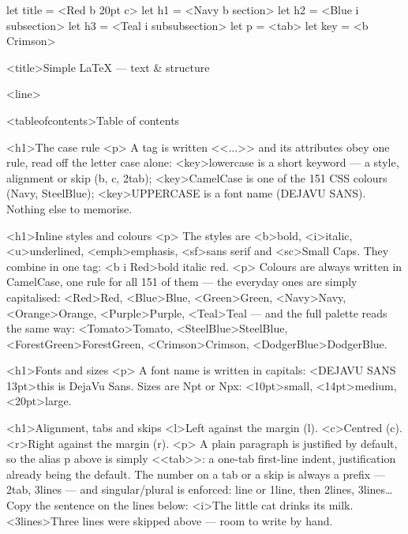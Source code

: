 \documentclass[
margins=20,
font=Latin Modern Roman,
size=12,
lang=en
]{scholatex}
\begin{document}
	
	let title = <Red b 20pt c>
	let h1    = <Navy b section>
	let h2    = <Blue i subsection>
	let h3    = <Teal i subsubsection>
	let p     = <tab>
	let key   = <b Crimson>
	
	<title>Simple LaTeX — text & structure
	
	<line>
	
	<tableofcontents>{Table of contents}
	
	<h1>The case rule
	<p>{
		A tag is written <<...>> and its attributes obey one rule, read off the
		letter case alone: <key>{lowercase} is a short keyword — a style,
		alignment or skip (b, c, 2tab); <key>{CamelCase} is one
		of the 151 CSS colours (Navy, SteelBlue);
		<key>{UPPERCASE} is a font name (DEJAVU SANS). Nothing else to
		memorise.
	}
	
	<h1>Inline styles and colours
	<p>{
		The styles are <b>{bold}, <i>{italic}, <u>{underlined}, <emph>{emphasis},
		<sf>{sans serif} and <sc>{Small Caps}. They combine in
		one tag: <b i Red>{bold italic red}.
	}
	<p>{
		Colours are always written in CamelCase, one rule for all 151 of them —
		the everyday ones are simply capitalised: <Red>{Red}, <Blue>{Blue},
		<Green>{Green}, <Navy>{Navy}, <Orange>{Orange}, <Purple>{Purple},
		<Teal>{Teal} — and the full palette reads the same way:
		<Tomato>{Tomato}, <SteelBlue>{SteelBlue}, <ForestGreen>{ForestGreen},
		<Crimson>{Crimson}, <DodgerBlue>{DodgerBlue}.
	}
	
	<h1>Fonts and sizes
	<p>{
		A font name is written in capitals: <DEJAVU SANS 13pt>{this is DejaVu Sans}.
		Sizes are Npt or Npx: <10pt>{small}, <14pt>{medium},
		<20pt>{large}.
	}
	
	<h1>Alignment, tabs and skips
	<l>Left against the margin (l).
	<c>Centred (c).
	<r>Right against the margin (r).
	<p>{
		A plain paragraph is justified by default, so the alias p above is
		simply <<tab>>: a one-tab first-line indent, justification already
		being the default. The number on a tab or a skip is always a prefix —
		2tab, 3lines — and singular/plural is enforced: line or
		1line, then 2lines, 3lines…
	}
	Copy the sentence on the lines below:
	<i>The little cat drinks its milk.
	<3lines>Three lines were skipped above — room to write by hand.
	
\end{document}
